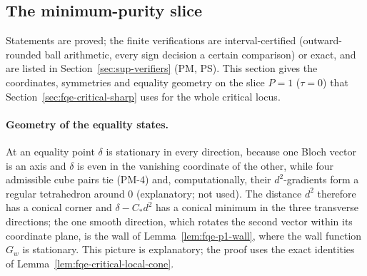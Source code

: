\subsection{The minimum-purity slice}
\label{sec:fqe-p1-sharp}
Statements are proved; the finite verifications are interval-certified (outward-rounded ball
arithmetic, every sign decision a certain comparison) or exact, and are listed in
Section~\ref{sec:sup-verifiers} (PM, PS).
This section gives the coordinates, symmetries and equality geometry on the slice $P=1$ ($\tau=0$) that
Section~\ref{sec:fqe-critical-sharp} uses for the whole critical locus.

\paragraph{Geometry of the equality states.}
At an equality point $\delta$ is stationary in every direction, because one Bloch vector is an axis
 and $\delta$ is even in the vanishing coordinate of the other, while four
admissible cube pairs tie (PM-4) and, computationally, their $d^2$-gradients form a regular tetrahedron around $0$ (explanatory; not used). The distance $d^2$
therefore has a conical corner and $\delta-C_*d^2$ has a conical minimum in the three transverse directions;
the one smooth direction, which rotates the second vector within its coordinate plane, is the wall of
Lemma~\ref{lem:fqe-p1-wall}, where the wall function $G_w$ is stationary.  This picture is explanatory; the proof uses the
exact identities of Lemma~\ref{lem:fqe-critical-local-cone}.

